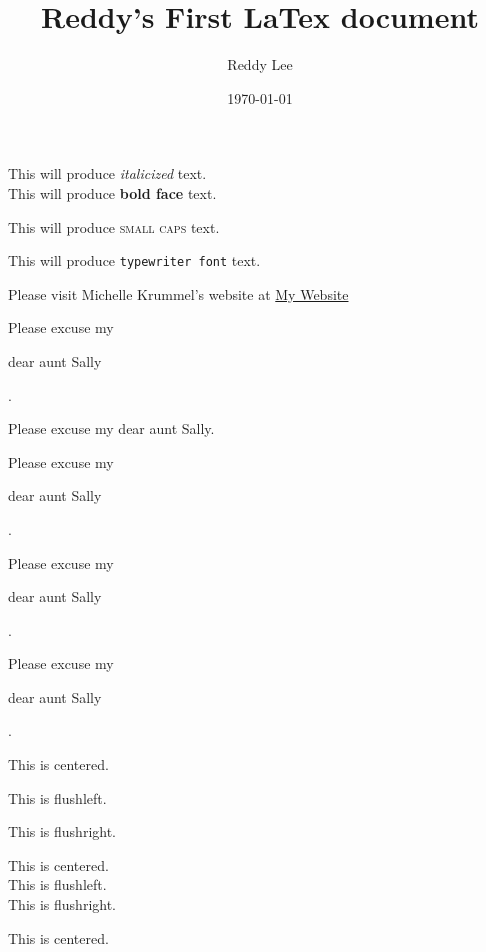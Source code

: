 \documentclass[12pt]{article}
\title{Reddy's First LaTex document}
\author{Reddy Lee}
\date{\today}
\begin{document}
\tableofcontents
\maketitle

This will produce \textit{italicized} text.\\

This will produce \textbf{bold face} text.

This will produce \textsc{small caps} text.

This will produce \texttt{typewriter font} text.

Please visit Michelle Krummel's website at \href{http://michellekrummel.com}{My Website}

\vspace{1cm}
Please excuse my \begin{small} dear aunt Sally \end{small}.

Please excuse my dear aunt Sally.

Please excuse my \begin{large} dear aunt Sally \end{large}.

Please excuse my \begin{Large} dear aunt Sally \end{Large}.

Please excuse my \begin{huge} dear aunt Sally \end{huge}.

\begin{center}\begin{huge}This is centered.\end{huge}\end{center}

\begin{flushleft}
This is flushleft.
\end{flushleft}

\begin{flushright}
This is flushright.
\end{flushright}

\tiny
This is centered.\\

This is flushleft.\\

This is flushright.



\huge
This is centered.\\
\end{document}
